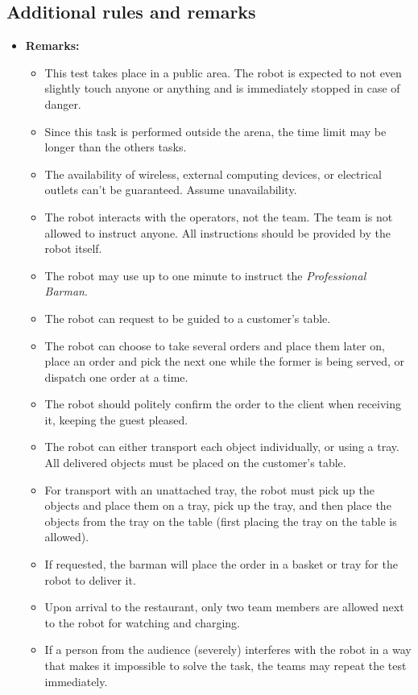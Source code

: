 \subsection*{Additional rules and remarks}
\begin{itemize}
	\item \textbf{Remarks:}
	\begin{itemize}
		\item This test takes place in a public area. The robot is expected to not even slightly touch anyone or anything and is immediately stopped in case of danger.
		\item Since this task is performed outside the arena, the time limit may be longer than the others tasks.
		\item The availability of wireless, external computing devices, or electrical outlets can't be guaranteed. Assume unavailability.
		\item The robot interacts with the operators, not the team. The team is not allowed to instruct anyone. All instructions should be provided by the robot itself.
		\item The robot may use up to one minute to instruct the \textit{Professional Barman}.
		\item The robot can request to be guided to a customer's table.
		\item The robot can choose to take several orders and place them later on, place an order and pick the next one while the former is being served, or dispatch one order at a time.
		\item The robot should politely confirm the order to the client when receiving it, keeping the guest pleased.
		\item The robot can either transport each object individually, or using a tray. All delivered objects must be placed on the customer's table.
		\item For transport with an unattached tray, the robot must pick up the objects and place them on a tray, pick up the tray, and then place the objects from the tray on the table (first placing the tray on the table is allowed).
		\item If requested, the barman will place the order in a basket or tray for the robot to deliver it.
		\item Upon arrival to the restaurant, only two team members are allowed next to the robot for watching and charging.
		\item If a person from the audience (severely) interferes with the robot in a way that makes it impossible to solve the task, the teams may repeat the test immediately.

\end{itemize}
\end{itemize}
